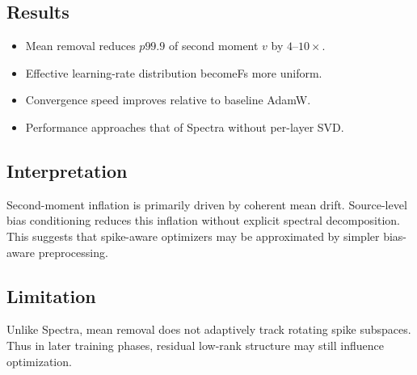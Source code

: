 \subsection{Results}

\begin{itemize}
\item Mean removal reduces $p99.9$ of second moment $v$ by $4$--$10\times$.
\item Effective learning-rate distribution becomeFs more uniform.
\item Convergence speed improves relative to baseline AdamW.
\item Performance approaches that of Spectra without per-layer SVD.
\end{itemize}

\subsection{Interpretation}

Second-moment inflation is primarily driven by coherent mean drift.
Source-level bias conditioning reduces this inflation
without explicit spectral decomposition.
This suggests that spike-aware optimizers may be approximated
by simpler bias-aware preprocessing.

\subsection{Limitation}

Unlike Spectra, mean removal does not adaptively track
rotating spike subspaces.
Thus in later training phases,
residual low-rank structure may still influence optimization.